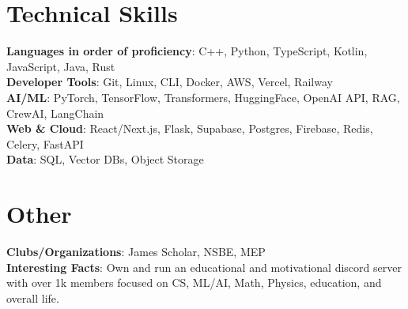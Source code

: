 \documentclass[letterpaper,10.99999999999999pt]{article}
\begin{document}
%
\begin{minipage}[t]{0.48\textwidth}
\section{Technical Skills}
 \begin{itemize}[leftmargin=0.15in, label={}]
    \small{\item{
     \textbf{Languages in order of proficiency}{: C++, Python, \newline TypeScript, Kotlin, JavaScript, Java, Rust} \\
     \textbf{Developer Tools}{: Git, Linux, CLI, Docker, AWS, Vercel, Railway} \\
     \textbf{AI/ML}{: PyTorch, TensorFlow, Transformers, HuggingFace, OpenAI API, RAG, CrewAI, LangChain} \\
     \textbf{Web \& Cloud}{: React/Next.js, Flask, Supabase, Postgres, Firebase, Redis, Celery, FastAPI} \\
     \textbf{Data}{: SQL, Vector DBs, Object Storage} \\
    }}
 \end{itemize}
\end{minipage}
\hfill
\vrule
\hfill
\begin{minipage}[t]{0.48\textwidth}
\section{Other}
 \begin{itemize}[leftmargin=0.15in, label={}]
    \small{\item{
    \textbf{Clubs/Organizations}{: James Scholar, NSBE, MEP} \\
    \textbf{Interesting Facts}{: Own and run an educational and motivational discord server with over 1k members focused on CS, ML/AI, Math, Physics, education, and overall life.} \\
    }}
 \end{itemize}
\end{minipage}
\end{document}
